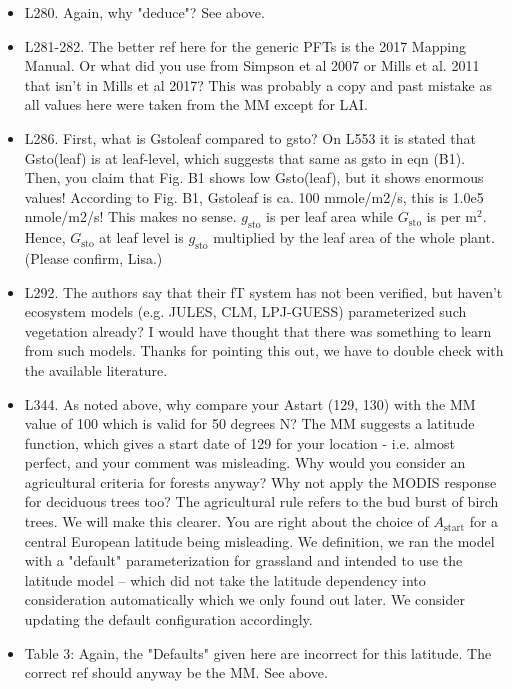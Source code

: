 \documentclass{scrartcl}
\begin{document}
\begin{itemize}
\item {\color{blue}L280. Again, why "deduce"?}
See above.

\item {\color{blue}L281-282. The better ref here for the generic PFTs is the 2017 Mapping Manual. Or what did you use from Simpson et al 2007 or Mills et al. 2011 that isn't in Mills et al 2017?}
This was probably a copy and past mistake as all values here were taken from the MM except for LAI.

\item {\color{blue}L286. First, what is Gstoleaf compared to gsto? On L553 it is stated that Gsto(leaf) is at leaf-level, which suggests that same as gsto in eqn (B1). Then, you claim that Fig. B1 shows low Gsto(leaf), but it shows enormous values! According to Fig. B1, Gstoleaf is ca. 100 mmole/m2/s, this is 1.0e5 nmole/m2/s! This makes no sense.}
$g_\mathrm{sto}$ is per leaf area while $G_\mathrm{sto}$ is per $\mathrm{m}^2$. Hence, $G_\mathrm{sto}$ at leaf level is $g_\mathrm{sto}$ multiplied by the leaf area of the whole plant. (Please confirm, Lisa.)

\item {\color{blue}L292. The authors say that their fT system has not been verified, but haven't ecosystem models (e.g. JULES, CLM, LPJ-GUESS) parameterized such vegetation already? I would have thought that there was something to learn from such models.}
Thanks for pointing this out, we have to double check with the available literature.

\item {\color{blue}L344. As noted above, why compare your Astart (129, 130) with the MM value of 100 which is valid for 50 degrees N? The MM suggests a latitude function, which gives a start date of 129 for your location - i.e. almost perfect, and your comment was misleading. Why would you consider an agricultural criteria for forests anyway? Why not apply the MODIS response for deciduous trees too?} The agricultural rule refers to the bud burst of birch trees. We will make this clearer. You are right about the choice of $A_\mathrm{start}$ for a central European latitude being misleading. We definition, we ran the model with a "default" parameterization for grassland and intended to use the latitude model -- which did not take the latitude dependency into consideration automatically which we only found out later. We consider updating the default configuration accordingly.

\item {\color{blue}Table 3: Again, the "Defaults" given here are incorrect for this latitude. The correct ref should anyway be the MM.}
See above.


\end{itemize}
\end{document}
